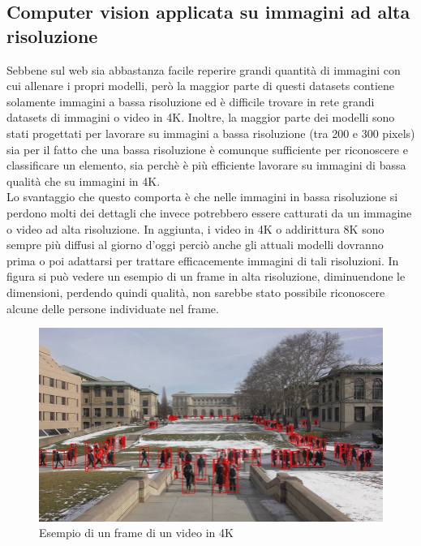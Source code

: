\subsection{Computer vision applicata su immagini ad alta risoluzione}
Sebbene sul web sia abbastanza facile reperire grandi quantità di immagini con cui allenare i propri modelli, però la maggior parte di questi datasets contiene solamente immagini a bassa risoluzione ed è difficile trovare in rete grandi datasets di immagini o video in 4K. Inoltre, la maggior parte dei modelli sono stati progettati per lavorare su immagini a bassa risoluzione (tra 200 e 300 pixels) sia per il fatto che una bassa risoluzione è comunque sufficiente per riconoscere e classificare un elemento, sia perchè è più efficiente lavorare su immagini di bassa qualità che su immagini in 4K.\\
Lo svantaggio che questo comporta è che nelle immagini in bassa risoluzione si perdono molti dei dettagli che invece potrebbero essere catturati da un immagine o video ad alta risoluzione. In aggiunta, i video in 4K o addirittura 8K sono sempre più diffusi al giorno d'oggi perciò anche gli attuali modelli dovranno prima o poi adattarsi per trattare efficacemente immagini di tali risoluzioni. In figura si può vedere un esempio di un frame in alta risoluzione, diminuendone le dimensioni, perdendo quindi qualità, non sarebbe stato possibile riconoscere alcune delle persone individuate nel frame.
\begin{figure}[H]
	\centering
	\includegraphics[width=0.7\linewidth]{images/Esempio-4K-video-frame.png}
	\caption{Esempio di un frame di un video in 4K}
	\label{Esempio di un frame di un video in 4K}
\end{figure}
